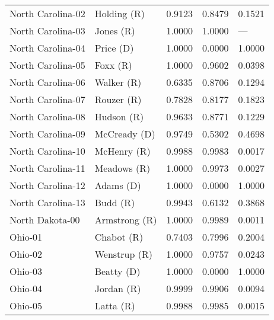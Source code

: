 \begin{longtable}{llrll}
 North Carolina-02 &          {\color{Red} Holding (R)} &       0.9123 &        0.8479 &        0.1521 \\
 North Carolina-03 &            {\color{Red} Jones (R)} &       1.0000 &        1.0000 &           --- \\
 North Carolina-04 &           {\color{Blue} Price (D)} &       1.0000 &        0.0000 &        1.0000 \\
 North Carolina-05 &             {\color{Red} Foxx (R)} &       1.0000 &        0.9602 &        0.0398 \\
 North Carolina-06 &           {\color{Red} Walker (R)} &       0.6335 &        0.8706 &        0.1294 \\
 North Carolina-07 &           {\color{Red} Rouzer (R)} &       0.7828 &        0.8177 &        0.1823 \\
 North Carolina-08 &           {\color{Red} Hudson (R)} &       0.9633 &        0.8771 &        0.1229 \\
 North Carolina-09 &        {\color{Blue} McCready (D)} &       0.9749 &        0.5302 &        0.4698 \\
 North Carolina-10 &          {\color{Red} McHenry (R)} &       0.9988 &        0.9983 &        0.0017 \\
 North Carolina-11 &          {\color{Red} Meadows (R)} &       1.0000 &        0.9973 &        0.0027 \\
 North Carolina-12 &           {\color{Blue} Adams (D)} &       1.0000 &        0.0000 &        1.0000 \\
 North Carolina-13 &             {\color{Red} Budd (R)} &       0.9943 &        0.6132 &        0.3868 \\
   North Dakota-00 &        {\color{Red} Armstrong (R)} &       1.0000 &        0.9989 &        0.0011 \\
           Ohio-01 &           {\color{Red} Chabot (R)} &       0.7403 &        0.7996 &        0.2004 \\
           Ohio-02 &         {\color{Red} Wenstrup (R)} &       1.0000 &        0.9757 &        0.0243 \\
           Ohio-03 &          {\color{Blue} Beatty (D)} &       1.0000 &        0.0000 &        1.0000 \\
           Ohio-04 &           {\color{Red} Jordan (R)} &       0.9999 &        0.9906 &        0.0094 \\
           Ohio-05 &            {\color{Red} Latta (R)} &       0.9988 &        0.9985 &        0.0015 \\

\end{longtable}
